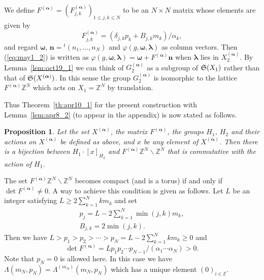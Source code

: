 \documentclass[11pt]{article}
\newtheorem{proposition}{Proposition}
\newcommand{\Z}{{\mathbb Z}}
\newcommand\bom{\boldsymbol{\omega}}
\newcommand\bol{\boldsymbol{\lambda}}
\newcommand\boa{\boldsymbol{\alpha}}
\begin{document}
We def\/ine $F^{(\boa)} = (F^{(\boa)}_{j,k})_{1 \leq j,k \leq N}$ to be an $N \times N$ matrix whose elements are given by
\begin{equation}\label{eq:may15_1}
F^{(\boa)}_{j,k} = (\delta_{j,k} p_k + B_{j,k} m_k)/\alpha_k ,
\end{equation}
and regard $\bom$, $\boldsymbol{n} = {}^t (n_1,\ldots,n_N)$ and $\varphi(g,\bom,\bol)$ as column vectors.
Then (\ref{eq:may1_2}) is written as
$\varphi(g,\bom,\bol) = \bom + F^{(\boa)} \boldsymbol{n}$
when $\bol$ lies in $X_2^{(\boa)}$.
By Lemma~\ref{lem:oct19_1} we can
think of $G_2^{(\boa)}$ as a
subgroup of ${\frak S}(X_1)$ rather than that of ${\frak S}(X^{(\boa)})$.
In this sense the group $G_2^{(\boa)}$ is isomorphic to the lattice $F^{(\boa)} \Z^N$
which acts on $X_1 = \Z^N$ by translation.

Thus Theorem~\ref{th:apr10_1} for the present construction with Lemma~\ref{lem:apr8_2}
(to appear in the appendix)
is now stated as follows.
\begin{proposition}\label{prop:apr22_1}
Let the set $X^{(\boa)}$, the matrix $F^{(\boa)}$, the groups $H_1$, $H_2$ and their actions on $X^{(\boa)}$
be def\/ined as above, and
$x$ be any element of $X^{(\boa)}$.
Then there is a bijection between $H_1 \cdot [x]_{H_2}$ and $F^{(\boa)} \Z^N \backslash \Z^N$
that is commutative with the action of $H_1$.
\end{proposition}
The set $F^{(\boa)} \Z^N \backslash \Z^N$ becomes compact {(and is a torus)} if and only if $\det F^{(\boa)} \ne 0$.
A way to achieve this condition is given as follows.
Let $L$ be an integer satisfying $L \geq 2 \sum_{k=1}^N k m_k$ and set
\begin{gather}\label{eq:may15_2}
p_j = L - 2\sum_{k =1}^N \min(j,k)m_k,\\
B_{j,k} = 2 \min (j,k).\label{eq:may26_1}
\end{gather}
Then we have $L > p_1 > p_2 > \cdots > p_N = L - 2 \sum_{k=1}^N k m_k \geq 0$ and
\begin{equation*}
\det F^{(\boa)} = L p_1 p_2 \cdots p_{N-1}/(\alpha_1 \cdots \alpha_N) > 0.
\end{equation*}
Note that $p_N=0$ is allowed here.
In this case we have $\Lambda (m_N,p_N) = \Lambda^{(m_N)} (m_N,p_N)$ which has {a unique} element $(0)_{i \in \Z}$.
\end{document}
